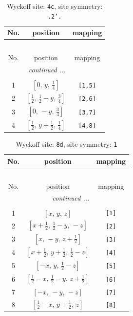 \documentclass[fleqn,8pt]{jsarticle}
\begin{document}
\renewcommand{\arraystretch}{1.2}
\begin{longtable}{ccc}
\caption{Wyckoff site: {\tt 4c}, site symmetry: {\tt .2'.}}
 \\
 \hline \hline
No. & position & mapping \\ \hline \endfirsthead

\multicolumn{2}{l}{\tablename\ \thetable{}} \\
 \hline \hline
No. & position & mapping \\ \hline \endhead

 \hline \hline
\multicolumn{2}{r}{\footnotesize\it continued ...} \\ \endfoot

 \hline \hline
\multicolumn{2}{r}{} \\ \endlastfoot

1 & $\left[ 0,\, y,\, \frac{1}{4} \right]$ & {\tt [1,5]} \\ \hline
2 & $\left[ \frac{1}{2},\, \frac{1}{2} - y,\, \frac{3}{4} \right]$ & {\tt [2,6]} \\ \hline
3 & $\left[ 0,\, - y,\, \frac{3}{4} \right]$ & {\tt [3,7]} \\ \hline
4 & $\left[ \frac{1}{2},\, y + \frac{1}{2},\, \frac{1}{4} \right]$ & {\tt [4,8]} \\
\end{longtable}
\renewcommand{\arraystretch}{1.2}
\begin{longtable}{ccc}
\caption{Wyckoff site: {\tt 8d}, site symmetry: {\tt 1}}
 \\
 \hline \hline
No. & position & mapping \\ \hline \endfirsthead

\multicolumn{2}{l}{\tablename\ \thetable{}} \\
 \hline \hline
No. & position & mapping \\ \hline \endhead

 \hline \hline
\multicolumn{2}{r}{\footnotesize\it continued ...} \\ \endfoot

 \hline \hline
\multicolumn{2}{r}{} \\ \endlastfoot

1 & $\left[ x,\, y,\, z \right]$ & {\tt [1]} \\ \hline
2 & $\left[ x + \frac{1}{2},\, \frac{1}{2} - y,\, - z \right]$ & {\tt [2]} \\ \hline
3 & $\left[ x,\, - y,\, z + \frac{1}{2} \right]$ & {\tt [3]} \\ \hline
4 & $\left[ x + \frac{1}{2},\, y + \frac{1}{2},\, \frac{1}{2} - z \right]$ & {\tt [4]} \\ \hline
5 & $\left[ - x,\, y,\, \frac{1}{2} - z \right]$ & {\tt [5]} \\ \hline
6 & $\left[ \frac{1}{2} - x,\, \frac{1}{2} - y,\, z + \frac{1}{2} \right]$ & {\tt [6]} \\ \hline
7 & $\left[ - x,\, - y,\, - z \right]$ & {\tt [7]} \\ \hline
8 & $\left[ \frac{1}{2} - x,\, y + \frac{1}{2},\, z \right]$ & {\tt [8]} \\
\end{longtable}
\end{document}

